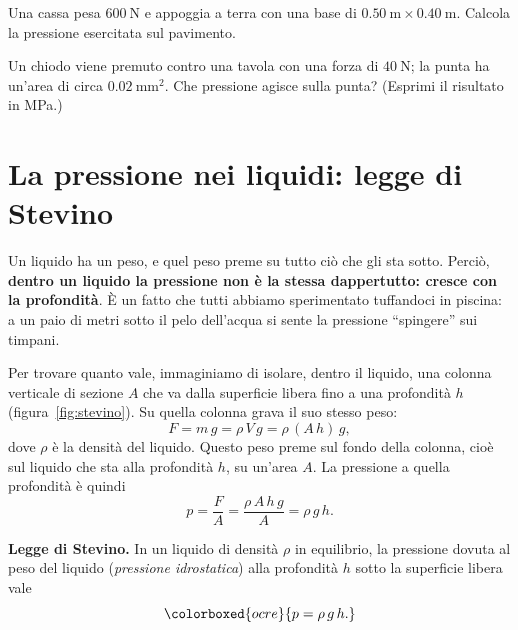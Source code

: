 \begin{esercizio}
Una cassa pesa $\SI{600}{\newton}$ e appoggia a terra con una base di $\SI{0,50}{\metre}\times\SI{0,40}{\metre}$. Calcola la pressione esercitata sul pavimento.\\
\end{esercizio}

\begin{esercizio}
Un chiodo viene premuto contro una tavola con una forza di $\SI{40}{\newton}$; la punta ha un'area di circa $\SI{0,02}{\milli\metre\squared}$. Che pressione agisce sulla punta? (Esprimi il risultato in \si{\mega\pascal}.)\\
\end{esercizio}


\section{La pressione nei liquidi: legge di Stevino}

Un liquido ha un peso, e quel peso preme su tutto ciò che gli sta sotto. Perciò, \textbf{dentro un liquido la pressione non è la stessa dappertutto: cresce con la profondità}. È un fatto che tutti abbiamo sperimentato tuffandoci in piscina: a un paio di metri sotto il pelo dell'acqua si sente la pressione ``spingere'' sui timpani.

Per trovare quanto vale, immaginiamo di isolare, dentro il liquido, una colonna verticale di sezione $A$ che va dalla superficie libera fino a una profondità $h$ (figura~\ref{fig:stevino}). Su quella colonna grava il suo stesso peso:
\[ F = m\,g = \rho\,V\,g = \rho\,(A\,h)\,g, \]
dove $\rho$ è la densità del liquido. Questo peso preme sul fondo della colonna, cioè sul liquido che sta alla profondità $h$, su un'area $A$. La pressione a quella profondità è quindi
\[ p = \frac{F}{A} = \frac{\rho\,A\,h\,g}{A} = \rho\,g\,h. \]

\begin{definizione}
\textbf{Legge di Stevino.} In un liquido di densità $\rho$ in equilibrio, la pressione dovuta al peso del liquido (\emph{pressione idrostatica}) alla profondità $h$ sotto la superficie libera vale
\[ \colorboxed{ocre}{ p = \rho\,g\,h. } \]
\end{definizione}


